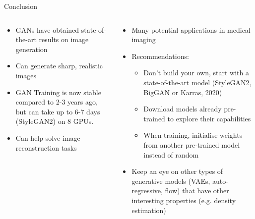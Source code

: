 \documentclass[8pt,xcolor=table,aspectratio=169]{beamer}
\begin{document}
\begin{frame}{Conclusion}
\begin{columns}
\begin{column}{0.5\textwidth}
\begin{itemize}
\item GANs have obtained state-of-the-art results on image generation

\vspace{2em}

\item Can generate sharp, realistic images

\vspace{2em}

\item GAN Training is now stable compared to 2-3 years ago, but can take up to 6-7 days (StyleGAN2) on 8 GPUs. 

\vspace{2em}

\item Can help solve image reconstruction tasks 

\vspace{2em}

\end{itemize}
\end{column}
\begin{column}{0.5\textwidth}

\begin{itemize}
\item Many potential applications in medical imaging

\vspace{2em}

\item Recommendations:
 \begin{itemize}
  \item Don't build your own, start with a state-of-the-art model (StyleGAN2, BigGAN or Karras, 2020)
  \item Download models already pre-trained to explore their capabilities
  \item When training, initialise weights from another pre-trained model instead of random
 \end{itemize}

\vspace{2em}

\item Keep an eye on other types of generative models (VAEs, auto-regressive, flow) that have other interesting properties (e.g. density estimation)

\end{itemize}

\end{column}
\end{columns}

\end{frame}
\end{document}
